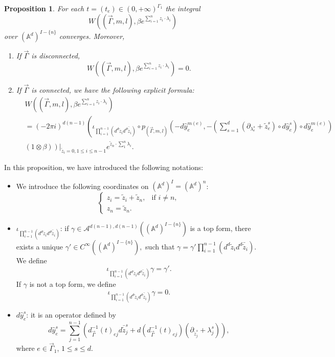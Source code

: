 \documentclass[11pt]{amsart}
\newtheorem{prop}[thm]{Proposition}
\theoremstyle{definition}
\theoremstyle{remark}
\numberwithin{equation}{section}
\begin{document}
\begin{prop}\label{explicit formula}
  For each $t = (t_{e})\in(0,+\infty)^{\Gamma_1}$ the integral
    $$
    W((\vec{\Gamma},m,l),\beta e^{\sum_{i=1}^{n}z_{i}\cdot\lambda_{i}})
    $$
    over $(\mathbb{A}^d)^{I-\{n\}}$ converges. 
    Moreover,
    \begin{enumerate}
        \item If $\vec{\Gamma}$ is disconnected,
        $$
        W((\vec{\Gamma},m,l),\beta e^{\sum_{i=1}^{n}z_{i}\cdot\lambda_{i}})=0.
        $$
        \item If $\vec{\Gamma}$ is connected, we have the following explicit formula:
        \begin{align*}
            &W((\vec{\Gamma},m,l),\beta e^{\sum_{i=1}^{n}z_{i}\cdot\lambda_{i}})\\
            &=(-2\pi i)^{d(n-1)}\left(
        \iota_{\prod_{i=1}^{n-1}(d^{d}\tilde{z}_{i}d^{d}\bar{\tilde{z}}_{i})}\circ p_{(\vec{\Gamma},m,l)}(-d\hat{y}_{e}^{m(e)},-(\sum_{s=1}^{d}(\partial_{\lambda_{e}^{s}}+\tilde{z}_{e}^{s})\circ d\hat{y}_{e}^{s})\circ d\hat{y}_{e}^{m(e)})
        \right.\\
        &\left.\left.(1\otimes \beta)\right)\right|_{\tilde{z}_{i}=0,1\leq i\leq n-1} e^{\tilde{z}_{n}\cdot\sum_{1}^{n}\lambda_{i}}.
        \end{align*}
    \end{enumerate}
  \end{prop}
  In this proposition, we have introduced the following notations: 
    \begin{itemize}
      \item We introduce the following coordinates on $(\mathbb{A}^{d})^{ I}=(\mathbb{A}^d)^n$:
$$
\begin{cases}
    z_{i}=\tilde{z}_{i}+\tilde{z}_{n}, &\text{if }i\neq n,\\
    z_{n}=\tilde{z}_{n}.
\end{cases}
$$
        \item $\iota_{\prod_{i=1}^{n-1}(d^{d}\tilde{z}_{i}d^{d}\bar{\tilde{z}}_{i})}$: if $
        \gamma\in \mathcal{A}^{d(n-1),d(n-1)}((\mathbb{A}^d)^{ I-\{n\}})
        $ is a top form, there exists a unique
        $
        \gamma'\in C^{\infty}((\mathbb{A}^d)^{ I-\{n\}}),
        $
        such that
        $
        \gamma=\gamma'\prod_{i=1}^{n-1}(d^{d}\tilde{z}_{i}d^{d}\bar{\tilde{z}}_{i}).
        $
        We define 
        $$
        \iota_{\prod_{i=1}^{n-1}(d^{d}\tilde{z}_{i}d^{d}\bar{\tilde{z}}_{i})}\gamma=\gamma'.
        $$
        If $\gamma$ is not a top form, we define
        $$
        \iota_{\prod_{i=1}^{n-1}(d^{d}\tilde{z}_{i}d^{d}\bar{\tilde{z}}_{i})}\gamma=0.
        $$
        \item $d\hat{y}_{e}^{s}$: it is an operator defined by
        $$
        d\hat{y}_{e}^{s}=\sum_{j=1}^{n-1}\left(d^{-1}_{\vec{\Gamma}}(t)_{ej}d\bar{\tilde{z}}_{j}^{s}+d(d^{-1}_{\vec{\Gamma}}(t)_{ej})(\partial_{\tilde{z}_{j}^{s}}+\lambda_{j}^{s})\right),
        $$
        where $e\in \vec{\Gamma}_{1}$, $1\leq s\leq d$.
    \end{itemize}
\end{document}
